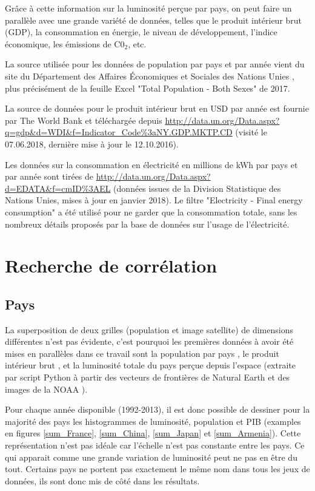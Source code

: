 \documentclass[a4paper, 11pt]{report}
\begin{document}
Grâce à cette information sur la luminosité perçue par pays, on peut faire un parallèle avec une grande variété de données, telles que le produit intérieur brut (GDP), la consommation en énergie, le niveau de développement, l'indice économique, les émissions de C0$_2$, etc.

La source utilisée pour les données de population par pays et par année vient du site du Département des Affaires Économiques et Sociales des Nations Unies \cite{un-wpp}, plus précisément de la feuille Excel "Total Population - Both Sexes" de 2017.

La source de données pour le produit intérieur brut en USD par année est fournie par The World Bank \cite{theworldbank} et téléchargée depuis \url{http://data.un.org/Data.aspx?q=gdp&d=WDI&f=Indicator_Code%3aNY.GDP.MKTP.CD} (visité le 07.06.2018, dernière mise à jour le 12.10.2016).

Les données sur la consommation en électricité en millions de kWh par pays et par année sont tirées de \url{http://data.un.org/Data.aspx?d=EDATA&f=cmID%3AEL} (données issues de la Division Statistique des Nations Unies, mises à jour en janvier 2018). Le filtre "Electricity - Final energy consumption" a été utilisé pour ne garder que la consommation totale, sans les nombreux détails proposés par la base de données sur l'usage de l'électricité.

\section{Recherche de corrélation}
\subsection{Pays}
La superposition de deux grilles (population et image satellite) de dimensions différentes n'est pas évidente, c'est pourquoi les premières données à avoir été mises en parallèles dans ce travail sont la population par pays \cite{un-wpp}, le produit intérieur brut \cite{theworldbank}, et la luminosité totale du pays perçue depuis l'espace (extraite par script Python à partir des vecteurs de frontières de Natural Earth \cite{naturalearthdata} et des images de la NOAA \cite{noaa}).

Pour chaque année disponible (1992-2013), il est donc possible de dessiner pour la majorité des pays les histogrammes de luminosité, population et PIB (examples en figures \ref{sum_France}, \ref{sum_China}, \ref{sum_Japan} et \ref{sum_Armenia}). Cette représentation n'est pas idéale car l'échelle n'est pas constante entre les pays. Ce qui apparait comme une grande variation de luminosité peut ne pas en être du tout. Certains pays ne portent pas exactement le même nom dans tous les jeux de données, ils sont donc mis de côté dans les résultats.
\end{document}

